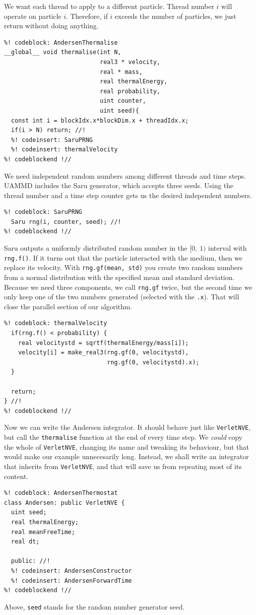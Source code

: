 We want each thread to apply to a different particle. Thread number $i$ will 
operate on particle $i$. Therefore, if $i$ exceeds the number of particles, we 
just return without doing anything.
\begin{lstlisting}
%! codeblock: AndersenThermalise
__global__ void thermalise(int N,
                           real3 * velocity,
                           real * mass,
                           real thermalEnergy,
                           real probability,
                           uint counter,
                           uint seed){
  const int i = blockIdx.x*blockDim.x + threadIdx.x;
  if(i > N) return; //!
  %! codeinsert: SaruPRNG
  %! codeinsert: thermalVelocity
%! codeblockend !//
\end{lstlisting}
We need independent random numbers among different threads and time steps. UAMMD 
includes the Saru generator, which accepts three seeds. Using the thread number 
and a time step counter gets us the desired independent numbers.
\begin{lstlisting}
%! codeblock: SaruPRNG
  Saru rng(i, counter, seed); //!
%! codeblockend !//
\end{lstlisting}
Saru outputs a uniformly distributed random number in the $[0,\ 1)$ interval 
with \texttt{rng.f()}. If it turns out that the particle interacted with the 
medium, then we replace its velocity. With \texttt{rng.gf(mean, std)} you create 
two random numbers from a normal distribution with the specified mean and 
standard deviation. Because we need three components, we call \texttt{rng.gf} 
twice, but the second time we only keep one of the two numbers generated 
(selected with the \texttt{.x}). That will close the parallel section of our 
algorithm.
\begin{lstlisting}
%! codeblock: thermalVelocity
  if(rng.f() < probability) {
    real velocitystd = sqrtf(thermalEnergy/mass[i]);
    velocity[i] = make_real3(rng.gf(0, velocitystd),
                             rng.gf(0, velocitystd).x);
  }

  return;
} //!
%! codeblockend !//
\end{lstlisting}

Now we can write the Andersen integrator. It should behave just like 
\texttt{VerletNVE}, but call the \texttt{thermalise} function at the end of 
every time step. We \textit{could} copy the whole of \texttt{VerletNVE},
changing its name and tweaking its behaviour, but that would make our example 
unnecesarily long. Instead, we shall write an integrator that inherits from
\texttt{VerletNVE}, and that will save us from repeating most of its content.
\begin{lstlisting}
%! codeblock: AndersenThermostat
class Andersen: public VerletNVE {
  uint seed;
  real thermalEnergy;
  real meanFreeTime;
  real dt;

  public: //!
  %! codeinsert: AndersenConstructor
  %! codeinsert: AndersenForwardTime
%! codeblockend !//
\end{lstlisting}
Above, \texttt{seed} stands for the random number generator seed.

